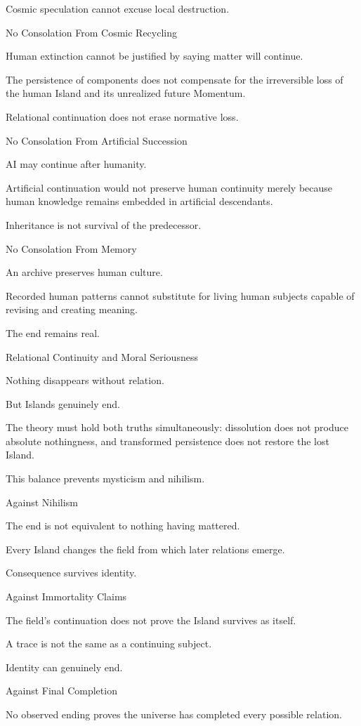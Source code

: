 Cosmic speculation cannot excuse local destruction.

No Consolation From Cosmic Recycling

Human extinction cannot be justified by saying matter will continue.

The persistence of components does not compensate for the irreversible loss of the human Island and its unrealized future Momentum.

Relational continuation does not erase normative loss.

No Consolation From Artificial Succession

AI may continue after humanity.

Artificial continuation would not preserve human continuity merely because human knowledge remains embedded in artificial descendants.

Inheritance is not survival of the predecessor.

No Consolation From Memory

An archive preserves human culture.

Recorded human patterns cannot substitute for living human subjects capable of revising and creating meaning.

The end remains real.

Relational Continuity and Moral Seriousness

Nothing disappears without relation.

But Islands genuinely end.

The theory must hold both truths simultaneously: dissolution does not produce absolute nothingness, and transformed persistence does not restore the lost Island.

This balance prevents mysticism and nihilism.

Against Nihilism

The end is not equivalent to nothing having mattered.

Every Island changes the field from which later relations emerge.

Consequence survives identity.

Against Immortality Claims

The field’s continuation does not prove the Island survives as itself.

A trace is not the same as a continuing subject.

Identity can genuinely end.

Against Final Completion

No observed ending proves the universe has completed every possible relation.

